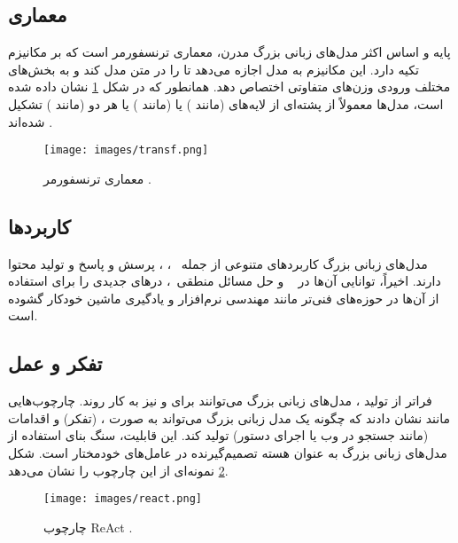 \subsection{معماری}
پایه و اساس اکثر مدل‌های زبانی بزرگ مدرن، معماری ترنسفورمر است که بر مکانیزم  تکیه دارد. این مکانیزم به مدل اجازه می‌دهد تا  را در متن مدل کند و به بخش‌های مختلف ورودی وزن‌های متفاوتی اختصاص دهد. همانطور که در شکل \ref{fig:transformer} نشان داده شده است، مدل‌ها معمولاً از پشته‌ای از لایه‌های  (مانند ) یا  (مانند ) یا هر دو (مانند ) تشکیل شده‌اند \cite{vaswani2017attention}.
\begin{figure}[h!]
    \centering
    \texttt{[image: images/transf.png]}
    \caption[معماری ترنسفورمر]{
        معماری ترنسفورمر
        \cite{vaswani2017attention}.
    }    
    \label{fig:transformer}
    
\end{figure}
\subsection{کاربردها}
مدل‌های زبانی بزرگ کاربردهای متنوعی از جمله ~\cite{wang-etal-2023-document-level}، ، پرسش و پاسخ و تولید محتوا دارند. اخیراً، توانایی آن‌ها در ~\cite{gao2023pal} و حل مسائل منطقی~\cite{pan-etal-2023-logic}، درهای جدیدی را برای استفاده از آن‌ها در حوزه‌های فنی‌تر مانند مهندسی نرم‌افزار و یادگیری ماشین خودکار گشوده است.

\subsection{تفکر و عمل}
فراتر از تولید ، مدل‌های زبانی بزرگ می‌توانند برای  و  نیز به کار روند. چارچوب‌هایی مانند  \cite{yao2023react} نشان دادند که چگونه یک مدل زبانی بزرگ می‌تواند به صورت ،  (تفکر) و اقدامات (مانند جستجو در وب یا اجرای دستور) تولید کند. این قابلیت، سنگ بنای استفاده از مدل‌های زبانی بزرگ به عنوان هسته تصمیم‌گیرنده در عامل‌های خودمختار است. شکل \ref{fig:react} نمونه‌ای از این چارچوب را نشان می‌دهد.
\begin{figure}[h!]
    \centering
    \texttt{[image: images/react.png]}
    \caption[چارچوب ReAct]{
        چارچوب ReAct
        \cite{yao2023react}.
    }
    \label{fig:react}
\end{figure}

